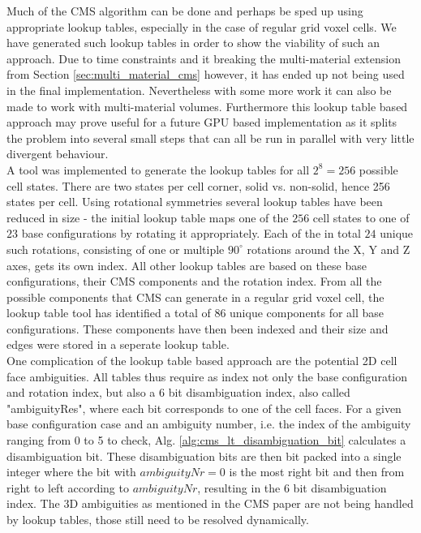 Much of the CMS algorithm can be done and perhaps be sped up using appropriate lookup tables, especially in the case of regular grid voxel cells. We have generated such lookup tables in order to show
the viability of such an approach. Due to time constraints and it breaking the multi-material extension from Section \ref{sec:multi_material_cms} however, it has ended up not being used in the final implementation.
Nevertheless with some more work it can also be made to work with multi-material volumes. Furthermore this lookup table based approach may prove useful for a future GPU based implementation as it splits
the problem into several small steps that can all be run in parallel with very little divergent behaviour.\\
A tool was implemented to generate the lookup tables for all $2^8 = 256$ possible cell states. There are two states per cell corner, solid vs. non-solid, hence 256 states per cell. Using rotational symmetries several lookup tables have been reduced in size - the initial lookup table maps one of the $256$ cell states to one of $23$ base configurations by rotating it appropriately. Each of the in total $24$ unique such rotations, consisting of one or multiple $90^{\circ}$ rotations around the X, Y and Z axes, gets its own index.
All other lookup tables are based on these base configurations, their CMS components and the rotation index.
From all the possible components that CMS can generate in a regular grid voxel cell, the lookup table tool has identified a total of $86$ unique components for all base configurations. These components have
then been indexed and their size and edges were stored in a seperate lookup table.\\
One complication of the lookup table based approach are the potential 2D cell face ambiguities. All tables thus require as index not only the base configuration and rotation index, but also a $6$ bit disambiguation
index, also called "ambiguityRes", where each bit corresponds to one of the cell faces. For a given base configuration case and an ambiguity number, i.e. the index of the ambiguity ranging from 0 to 5 to check, Alg. \ref{alg:cms_lt_disambiguation_bit} calculates a disambiguation bit. These disambiguation bits are then bit packed into a single integer where the bit with $ambiguityNr = 0$ is the most right bit and then from right to left according to $ambiguityNr$, resulting in the $6$ bit disambiguation index. The 3D ambiguities as mentioned in the CMS paper are not being handled by lookup tables, those still need to be resolved dynamically.\\

